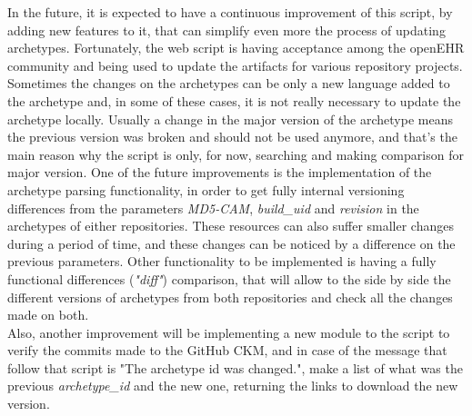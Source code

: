 \documentclass[mim_thesis.tex]{subfiles}
\begin{document}
In the future, it is expected to have a continuous improvement of this script, by adding new features to it, that can simplify even more the process of updating archetypes. Fortunately, the web script is having acceptance among the openEHR community and being used to update the artifacts for various repository projects. \\

Sometimes the changes on the archetypes can be only a new language added to the archetype and, in some of these cases, it is not really necessary to update the archetype locally. Usually a change in the major version of the archetype means the previous version was broken and should not be used anymore, and that's the main reason why the script is only, for now, searching and making comparison for major version. One of the future improvements is the implementation of the archetype parsing functionality, in order to get fully internal versioning differences from the parameters \textit{MD5-CAM}, \textit{build\_uid} and \textit{revision} in the archetypes of either repositories. These resources can also suffer smaller changes during a period of time, and these changes can be noticed by a difference on the previous parameters. Other functionality to be implemented is having a fully functional differences (\textit{"diff"}) comparison, that will allow to the side by side the different versions of archetypes from both repositories and check all the changes made on both. \\

Also, another improvement will be implementing a new module to the script to verify the commits made to the GitHub CKM, and in case of the message that follow that script is "The archetype id was changed.", make a list of what was the previous \textit{archetype\_id} and the new one, returning the links to download the new version.
\end{document}
